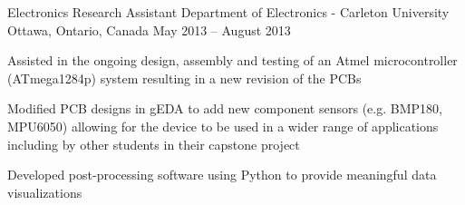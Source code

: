 \begin{cventries}
  \cventry
    {Electronics Research Assistant} %
    {Department of Electronics - Carleton University} %
    {Ottawa, Ontario, Canada} %
    {May 2013 – August 2013} %
    {
      \begin{cvitems} %
        \item {Assisted in the ongoing design, assembly and testing of an Atmel microcontroller (ATmega1284p) system resulting in a new revision of the PCBs}
        \item {Modified PCB designs in gEDA to add new component sensors (e.g. BMP180, MPU6050) allowing for the device to be used in a wider range of applications including by other students in their capstone project}
        \item {Developed post-processing software using Python to provide meaningful data visualizations}
        \\ %
      \end{cvitems}
    }
\end{cventries}

